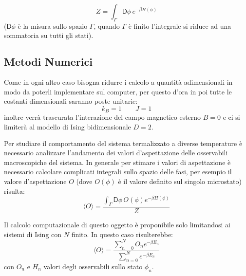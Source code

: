 \documentclass[11pt]{article}
\theoremstyle{plain}
\begin{document}
\begin{equation}\label{Partizione}
Z = \int_{\Gamma} \textsf{D}\phi \, e^{-\beta H(\phi)}
\end{equation}
($\textsf{D}\phi$ è la misura sullo spazio $\Gamma$, quando $\Gamma$ è finito l'integrale si riduce ad una sommatoria su tutti gli stati).


\subsection{Metodi Numerici}

Come in ogni altro caso bisogna ridurre i calcolo a quantità adimensionali in modo da poterli implementare sul computer, per questo d'ora in poi tutte le costanti dimensionali saranno poste unitarie:
$$ k_B = 1 \qquad J=1$$
inoltre verrà trascurata l'interazione del campo magnetico esterno $B=0$ e ci si limiterà al modello di Ising bidimensionale $D=2$.

Per studiare il comportamento del sistema termalizzato a diverse temperature è necessario analizzare l'andamento dei valori d'aspettazione delle osservabili macroscopiche del sistema.
In generale per stimare i valori di aspettazione è necessario calcolare complicati integrali sullo spazio delle fasi, per esempio il valore d'aspettazione $O$ (dove $O(\phi)$ è il valore definito sul singolo microstato) risulta: 
\begin{equation}\label{aspettazione teo}
\langle O \rangle = \frac{\int_{\Gamma} \textsf{D}\phi \,O(\phi) e^{-\beta H(\phi)}}{Z}
\end{equation}

Il calcolo computazionale di questo oggetto è proponibile solo limitandosi ai sistemi di Ising con $N$ finito. In questo caso risulterebbe:
\begin{equation}\label{aspettazione finito}
\langle O \rangle = \frac{\sum_{n=0}^{N} O_n e^{-\beta E_n}}{\sum_{n=0}^{N} e^{-\beta E_n}}
\end{equation}
con $O_n$ e $H_n$ valori degli osservabili sullo stato $\phi_n$.
\end{document}
